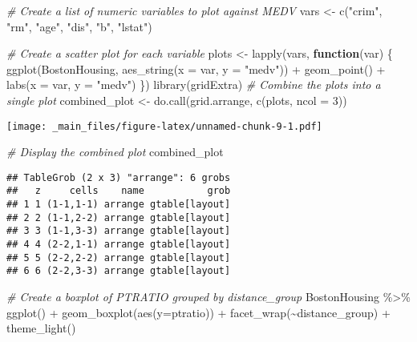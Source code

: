 \documentclass[
]{book}
\newenvironment{Shaded}{\begin{snugshade}}{\end{snugshade}}
\newcommand{\AttributeTok}[1]{\textcolor[rgb]{0.77,0.63,0.00}{#1}}
\newcommand{\AttributeTok}[1]{\textcolor[rgb]{0.13,0.29,0.53}{#1}}
\newcommand{\CommentTok}[1]{\textcolor[rgb]{0.56,0.35,0.01}{\textit{#1}}}
\newcommand{\ControlFlowTok}[1]{\textcolor[rgb]{0.13,0.29,0.53}{\textbf{#1}}}
\newcommand{\DecValTok}[1]{\textcolor[rgb]{0.00,0.00,0.81}{#1}}
\newcommand{\FunctionTok}[1]{\textcolor[rgb]{0.00,0.00,0.00}{#1}}
\newcommand{\FunctionTok}[1]{\textcolor[rgb]{0.13,0.29,0.53}{\textbf{#1}}}
\newcommand{\NormalTok}[1]{#1}
\newcommand{\OtherTok}[1]{\textcolor[rgb]{0.56,0.35,0.01}{#1}}
\newcommand{\SpecialCharTok}[1]{\textcolor[rgb]{0.00,0.00,0.00}{#1}}
\newcommand{\SpecialCharTok}[1]{\textcolor[rgb]{0.81,0.36,0.00}{\textbf{#1}}}
\newcommand{\StringTok}[1]{\textcolor[rgb]{0.31,0.60,0.02}{#1}}
\begin{document}
\begin{Shaded}
\begin{Highlighting}[]
\CommentTok{\# Create a list of numeric variables to plot against MEDV}
\NormalTok{vars }\OtherTok{\textless{}{-}} \FunctionTok{c}\NormalTok{(}\StringTok{"crim"}\NormalTok{, }\StringTok{"rm"}\NormalTok{, }\StringTok{"age"}\NormalTok{, }\StringTok{"dis"}\NormalTok{, }\StringTok{"b"}\NormalTok{, }\StringTok{"lstat"}\NormalTok{)}

\CommentTok{\# Create a scatter plot for each variable}
\NormalTok{plots }\OtherTok{\textless{}{-}} \FunctionTok{lapply}\NormalTok{(vars, }\ControlFlowTok{function}\NormalTok{(var) \{}
  \FunctionTok{ggplot}\NormalTok{(BostonHousing, }\FunctionTok{aes\_string}\NormalTok{(}\AttributeTok{x =}\NormalTok{ var, }\AttributeTok{y =} \StringTok{"medv"}\NormalTok{)) }\SpecialCharTok{+}
    \FunctionTok{geom\_point}\NormalTok{() }\SpecialCharTok{+}
    \FunctionTok{labs}\NormalTok{(}\AttributeTok{x =}\NormalTok{ var, }\AttributeTok{y =} \StringTok{"medv"}\NormalTok{)}
\NormalTok{\})}
\FunctionTok{library}\NormalTok{(gridExtra)}
\CommentTok{\# Combine the plots into a single plot}
\NormalTok{combined\_plot }\OtherTok{\textless{}{-}} \FunctionTok{do.call}\NormalTok{(grid.arrange, }\FunctionTok{c}\NormalTok{(plots, }\AttributeTok{ncol =} \DecValTok{3}\NormalTok{))}
\end{Highlighting}
\end{Shaded}

\texttt{[image: \_main\_files/figure-latex/unnamed-chunk-9-1.pdf]}

\begin{Shaded}
\begin{Highlighting}[]
\CommentTok{\# Display the combined plot}
\NormalTok{combined\_plot}
\end{Highlighting}
\end{Shaded}

\begin{verbatim}
## TableGrob (2 x 3) "arrange": 6 grobs
##   z     cells    name           grob
## 1 1 (1-1,1-1) arrange gtable[layout]
## 2 2 (1-1,2-2) arrange gtable[layout]
## 3 3 (1-1,3-3) arrange gtable[layout]
## 4 4 (2-2,1-1) arrange gtable[layout]
## 5 5 (2-2,2-2) arrange gtable[layout]
## 6 6 (2-2,3-3) arrange gtable[layout]
\end{verbatim}

\begin{Shaded}
\begin{Highlighting}[]
\CommentTok{\# Create a boxplot of PTRATIO grouped by distance\_group}
\NormalTok{BostonHousing }\SpecialCharTok{\%\textgreater{}\%} \FunctionTok{ggplot}\NormalTok{() }\SpecialCharTok{+} 
\FunctionTok{geom\_boxplot}\NormalTok{(}\FunctionTok{aes}\NormalTok{(}\AttributeTok{y=}\NormalTok{ptratio)) }\SpecialCharTok{+}
  \FunctionTok{facet\_wrap}\NormalTok{(}\SpecialCharTok{\textasciitilde{}}\NormalTok{distance\_group) }\SpecialCharTok{+}
  \FunctionTok{theme\_light}\NormalTok{()}
\end{Highlighting}
\end{Shaded}
\end{document}
